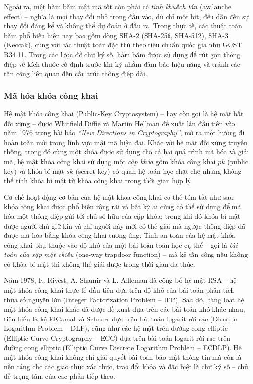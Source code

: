 Ngoài ra, một hàm băm mật mã tốt còn phải có \textit{tính khuếch tán} (avalanche effect) -- nghĩa là mọi thay đổi nhỏ trong đầu vào, dù chỉ một bit, đều dẫn đến sự thay đổi đáng kể và không thể dự đoán ở đầu ra. Trong thực tế, các thuật toán băm phổ biến hiện nay bao gồm dòng SHA-2 (SHA-256, SHA-512), SHA-3 (Keccak), cùng với các thuật toán đặc thù theo tiêu chuẩn quốc gia như GOST R34.11. Trong các lược đồ chữ ký số, hàm băm được sử dụng để rút gọn thông điệp về kích thước cố định trước khi ký nhằm đảm bảo hiệu năng và tránh các tấn công liên quan đến cấu trúc thông điệp dài.

\subsubsection{Mã hóa khóa công khai}

Hệ mật khóa công khai (Public-Key Cryptosystem) -- hay còn gọi là hệ mật bất đối xứng -- được Whitfield Diffie và Martin Hellman đề xuất lần đầu tiên vào năm 1976 trong bài báo \textit{``New Directions in Cryptography''}, mở ra một hướng đi hoàn toàn mới trong lĩnh vực mật mã hiện đại. Khác với hệ mật đối xứng truyền thống, trong đó cùng một khóa được sử dụng cho cả hai quá trình mã hóa và giải mã, hệ mật khóa công khai sử dụng một \textit{cặp khóa} gồm khóa công khai $pk$ (public key) và khóa bí mật $sk$ (secret key) có quan hệ toán học chặt chẽ nhưng không thể tính khóa bí mật từ khóa công khai trong thời gian hợp lý.

Cơ chế hoạt động cơ bản của hệ mật khóa công khai có thể tóm tắt như sau: khóa công khai được phổ biến rộng rãi và bất kỳ ai cũng có thể sử dụng để mã hóa một thông điệp gửi tới chủ sở hữu của cặp khóa; trong khi đó khóa bí mật được người chủ giữ kín và chỉ người này mới có thể giải mã ngược thông điệp đã được mã hóa bằng khóa công khai tương ứng. Tính an toàn của hệ mật khóa công khai phụ thuộc vào độ khó của một bài toán toán học cụ thể -- gọi là \textit{bài toán cửa sập một chiều} (one-way trapdoor function) -- mà kẻ tấn công nếu không có khóa bí mật thì không thể giải được trong thời gian đa thức.

Năm 1978, R. Rivest, A. Shamir và L. Adleman đã công bố hệ mật RSA -- hệ mật khóa công khai thực tế đầu tiên dựa trên độ khó của bài toán phân tích thừa số nguyên lớn (Integer Factorization Problem -- IFP). Sau đó, hàng loạt hệ mật khóa công khai khác đã được đề xuất dựa trên các bài toán khó khác nhau, tiêu biểu là hệ ElGamal và Schnorr dựa trên bài toán logarit rời rạc (Discrete Logarithm Problem -- DLP), cũng như các hệ mật trên đường cong elliptic (Elliptic Curve Cryptography -- ECC) dựa trên bài toán logarit rời rạc trên đường cong elliptic (Elliptic Curve Discrete Logarithm Problem -- ECDLP). Hệ mật khóa công khai không chỉ giải quyết bài toán bảo mật thông tin mà còn là nền tảng cho các giao thức xác thực, trao đổi khóa và đặc biệt là chữ ký số -- chủ đề trọng tâm của các phần tiếp theo.

